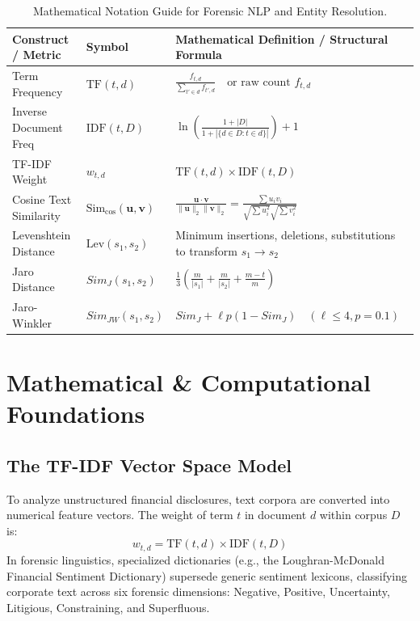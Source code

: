 \begin{table}[htbp]
\centering
\small
\begin{tabularx}{\textwidth}{llX}
\toprule
\textbf{Construct / Metric} & \textbf{Symbol} & \textbf{Mathematical Definition / Structural Formula} \\
\midrule
Term Frequency & $\text{TF}(t, d)$ & $\frac{f_{t,d}}{\sum_{t' \in d} f_{t',d}} \quad \text{or raw count } f_{t,d}$ \\
Inverse Document Freq & $\text{IDF}(t, D)$ & $\ln\left(\frac{1 + |D|}{1 + |\{d \in D : t \in d\}|}\right) + 1$ \\
TF-IDF Weight & $w_{t,d}$ & $\text{TF}(t, d) \times \text{IDF}(t, D)$ \\
Cosine Text Similarity & $\text{Sim}_{\cos}(\mathbf{u}, \mathbf{v})$ & $\frac{\mathbf{u} \cdot \mathbf{v}}{\|\mathbf{u}\|_2 \|\mathbf{v}\|_2} = \frac{\sum u_i v_i}{\sqrt{\sum u_i^2} \sqrt{\sum v_i^2}}$ \\
Levenshtein Distance & $\text{Lev}(s_1, s_2)$ & Minimum insertions, deletions, substitutions to transform $s_1 \to s_2$ \\
Jaro Distance & $Sim_J(s_1, s_2)$ & $\frac{1}{3} \left(\frac{m}{|s_1|} + \frac{m}{|s_2|} + \frac{m - t}{m}\right)$ \\
Jaro-Winkler & $Sim_{JW}(s_1, s_2)$ & $Sim_J + \ell p (1 - Sim_J) \quad (\ell \le 4, p = 0.1)$ \\
\bottomrule
\end{tabularx}
\caption{Mathematical Notation Guide for Forensic NLP and Entity Resolution.}
\label{tab:w11_notation}
\end{table}

\section{Mathematical \& Computational Foundations}

\subsection{The TF-IDF Vector Space Model}
To analyze unstructured financial disclosures, text corpora are converted into numerical feature vectors. The weight of term $t$ in document $d$ within corpus $D$ is:
\begin{equation}
w_{t,d} = \text{TF}(t, d) \times \text{IDF}(t, D)
\label{eq:tfidf_formula}
\end{equation}
In forensic linguistics, specialized dictionaries (e.g., the Loughran-McDonald Financial Sentiment Dictionary) supersede generic sentiment lexicons, classifying corporate text across six forensic dimensions: Negative, Positive, Uncertainty, Litigious, Constraining, and Superfluous.

